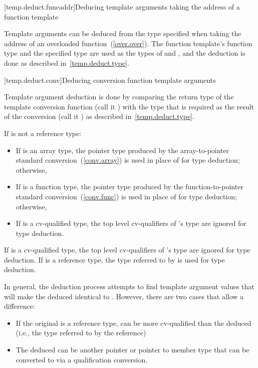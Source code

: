 [temp.deduct.funcaddr]{Deducing template arguments taking the address of a function template}

\pnum
Template arguments can be deduced from the type specified when taking
the address of an overloaded function~(\ref{over.over}).
The function template's function type and the specified type
are used as the types of
and
,
and the deduction is done as
described in~\ref{temp.deduct.type}.

[temp.deduct.conv]{Deducing conversion function template arguments}

\pnum
Template argument deduction is done by comparing the return type of
the template conversion function (call it ) with the type that is
required as the result of the conversion (call it )
as described in~\ref{temp.deduct.type}.

\pnum
If
is not a reference type:

\begin{itemize}
\item
If
is an array type, the pointer type produced by the
array-to-pointer standard conversion~(\ref{conv.array}) is used in place of
for type
deduction; otherwise,
\item
If
is a function type, the pointer type produced by the
function-to-pointer standard conversion~(\ref{conv.func}) is used in place of
for
type deduction; otherwise,
\item
If
is a cv-qualified type, the top level cv-qualifiers of
's
type are ignored for type deduction.
\end{itemize}

If
is a cv-qualified type, the top level cv-qualifiers of
's
type are ignored for type deduction.
If
is a reference type, the type referred to by
is used for type deduction.

\pnum
In general, the deduction process attempts to find template argument
values that will make the deduced
identical to
.
However, there are two cases that allow a difference:

\begin{itemize}
\item
If the original
is a reference type,
can be more cv-qualified
than the deduced
(i.e., the type referred to by the reference)
\item
The deduced
can be another pointer or pointer to member type that
can be converted to
via a qualification conversion.
\end{itemize}


